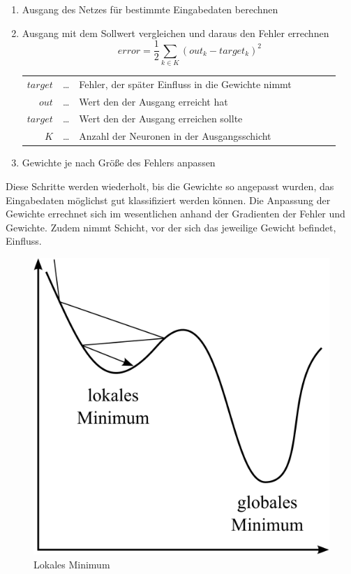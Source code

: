 \begin{enumerate}
\item Ausgang des Netzes für bestimmte Eingabedaten berechnen
\item Ausgang mit dem Sollwert vergleichen und daraus den Fehler errechnen
	$$error = \frac{1}{2}\sum_{k \in K}(out_k-target_k)^2$$
	\begin{center}\begin{tabular}{rclcrcl}
		$target$ & \dots & Fehler, der später Einfluss in die Gewichte nimmt\\
		$out$ & \dots & Wert den der Ausgang erreicht hat\\
		$target$ & \dots & Wert den der Ausgang erreichen sollte\\ 
		$K$ & \dots & Anzahl der Neuronen in der Ausgangsschicht\\
	\end{tabular}\end{center}
\item Gewichte je nach Größe des Fehlers anpassen
\end{enumerate}

Diese Schritte werden wiederholt, bis die Gewichte so angepasst wurden, das Eingabedaten möglichst gut klassifiziert werden können. Die Anpassung der Gewichte errechnet sich im wesentlichen anhand der Gradienten der Fehler und Gewichte. Zudem nimmt Schicht, vor der sich das jeweilige Gewicht befindet, Einfluss.

\begin{figure}
	\centering
	\includegraphics[scale=1]{images/lokales-minimum.png}
	\caption{Lokales Minimum}
	\label{fig:local-min}
\end{figure}

